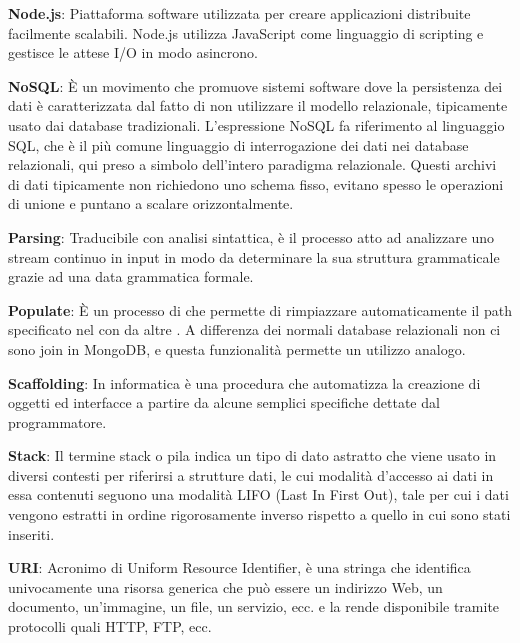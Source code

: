 \textbf{Node.js}: Piattaforma software utilizzata per creare applicazioni distribuite facilmente scalabili. Node.js utilizza JavaScript come linguaggio di scripting e gestisce le attese I/O in modo asincrono.

\textbf{NoSQL}: È un movimento che promuove sistemi software dove la persistenza dei dati è caratterizzata dal fatto di non utilizzare il modello relazionale, tipicamente usato dai database tradizionali. L'espressione NoSQL fa riferimento al linguaggio SQL, che è il più comune linguaggio di interrogazione dei dati nei database relazionali, qui preso a simbolo dell'intero paradigma relazionale. Questi archivi di dati tipicamente non richiedono uno schema fisso, evitano spesso le operazioni di unione e puntano a scalare orizzontalmente.


\textbf{Parsing}: Traducibile con analisi sintattica, è il processo atto ad analizzare uno stream continuo in input in modo da determinare la sua struttura grammaticale grazie ad una data grammatica formale.

\textbf{Populate}: È un processo di  che permette di rimpiazzare automaticamente il path specificato nel  con  da altre . A differenza dei normali database relazionali non ci sono join in MongoDB, e questa funzionalità permette un utilizzo analogo.

\textbf{Scaffolding}: In informatica è una procedura che automatizza la creazione di oggetti ed interfacce a partire da alcune semplici specifiche dettate dal programmatore.

\textbf{Stack}: Il termine stack o pila indica un tipo di dato astratto che viene usato in diversi contesti per riferirsi a strutture dati, le cui modalità d'accesso ai dati in essa contenuti seguono una modalità LIFO (Last In First Out), tale per cui i dati vengono estratti in ordine rigorosamente inverso rispetto a quello in cui sono stati inseriti.

\textbf{URI}: Acronimo di Uniform Resource Identifier, è una stringa che identifica univocamente una risorsa generica che può essere un indirizzo Web, un documento, un'immagine, un file, un servizio, ecc. e la rende disponibile tramite protocolli quali HTTP, FTP, ecc.